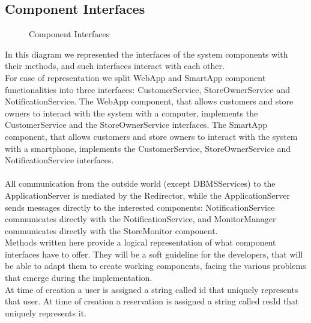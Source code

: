 \subsection{Component Interfaces}
\begin{figure}[H]
	\noindent
	\caption{Component Interfaces}
\end{figure}
In this diagram we represented the interfaces of the system components with their methods, and such interfaces interact with each other.\\
For ease of representation we split WebApp and SmartApp component functionalities into three interfaces: CustomerService, StoreOwnerService and NotificationService. The WebApp component, that allows customers and store owners to interact with the system with a computer, implements the CustomerService and the StoreOwnerService interfaces. The SmartApp component, that allows customers and store owners to interact with the system with a smartphone, implements the CustomerService, StoreOwnerService and NotificationService interfaces.\\\\
All communication from the outside world (except DBMSServices) to the ApplicationServer is mediated by the Redirector, while the ApplicationServer sends messages directly to the interested components: NotificationService communicates directly with the NotificationService, and MonitorManager communicates directly with the StoreMonitor component.\\
Methods written here provide a logical representation of what component interfaces have to offer. They will be a soft guideline for the developers, that will be able to adapt them to create working components, facing the various problems that emerge during the implementation.\\
At time of creation a user is assigned a string called id that uniquely represents that user. At time of creation a reservation is assigned a string called resId that uniquely represents it.\\
